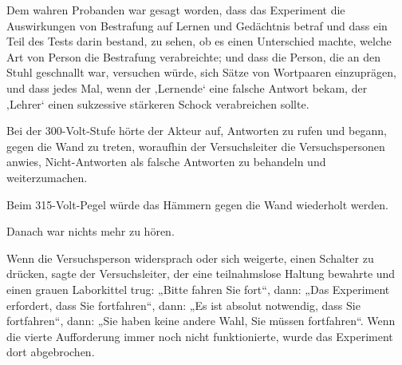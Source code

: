 Dem wahren Probanden war gesagt worden, dass das Experiment die Auswirkungen von Bestrafung auf Lernen und Gedächtnis betraf und dass ein Teil des Tests darin bestand, zu sehen, ob es einen Unterschied machte, welche Art von Person die Bestrafung verabreichte; und dass die Person, die an den Stuhl geschnallt war, versuchen würde, sich Sätze von Wortpaaren einzuprägen, und dass jedes Mal, wenn der ‚Lernende‘ eine falsche Antwort bekam, der ‚Lehrer‘ einen sukzessive stärkeren Schock verabreichen sollte.

Bei der 300-Volt-Stufe hörte der Akteur auf, Antworten zu rufen und begann, gegen die Wand zu treten, woraufhin der Versuchsleiter die Versuchspersonen anwies, Nicht-Antworten als falsche Antworten zu behandeln und weiterzumachen.

Beim 315-Volt-Pegel würde das Hämmern gegen die Wand wiederholt werden.

Danach war nichts mehr zu hören.

Wenn die Versuchsperson widersprach oder sich weigerte, einen Schalter zu drücken, sagte der Versuchsleiter, der eine teilnahmslose Haltung bewahrte und einen grauen Laborkittel trug:
„Bitte fahren Sie fort“, dann:
„Das Experiment erfordert, dass Sie fortfahren“, dann:
„Es ist absolut notwendig, dass Sie fortfahren“, dann:
„Sie haben keine andere Wahl, Sie müssen fortfahren“. Wenn die vierte Aufforderung immer noch nicht funktionierte, wurde das Experiment dort abgebrochen.

